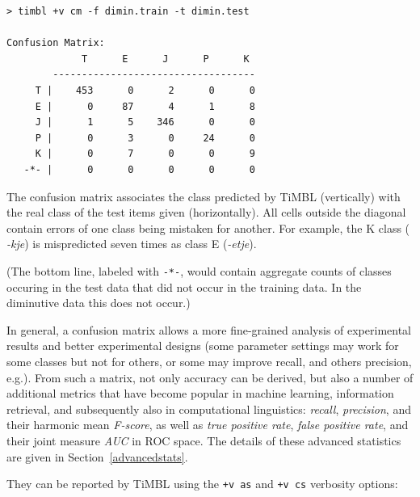 \documentclass{book}
\begin{document}
{\footnotesize
\begin{verbatim}
> timbl +v cm -f dimin.train -t dimin.test

Confusion Matrix:
             T      E      J      P      K
        -----------------------------------
     T |    453      0      2      0      0
     E |      0     87      4      1      8
     J |      1      5    346      0      0
     P |      0      3      0     24      0
     K |      0      7      0      0      9
   -*- |      0      0      0      0      0

\end{verbatim}
}

The confusion matrix associates the class predicted by TiMBL
(vertically) with the real class of the test items given
(horizontally). All cells outside the diagonal contain errors of one
class being mistaken for another. For example, the K class ({\em
  -kje}) is mispredicted seven times as class E ({\em -etje}).

(The bottom line, labeled with {\tt -*-}, would contain aggregate
counts of classes occuring in the test data that did not occur in the
training data. In the diminutive data this does not occur.)

In general, a confusion matrix allows a more fine-grained analysis of
experimental results and better experimental designs (some parameter
settings may work for some classes but not for others, or some may
improve recall, and others precision, e.g.). From such a matrix, not
only accuracy can be derived, but also a number of additional metrics
that have become popular in machine learning, information retrieval,
and subsequently also in computational linguistics: {\em recall},
{\em precision}, and their harmonic mean {\em F-score}, as well as {\em true
  positive rate}, {\em false positive rate}, and their joint measure
{\em AUC} in ROC space.  The details of these advanced statistics are
given in Section~\ref{advancedstats}.

They can be reported by TiMBL using the {\tt +v as} and {\tt +v cs}
verbosity options:
\end{document}
